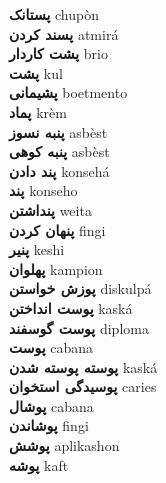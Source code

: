 \textbf{ پستانک  } chupòn \\
\textbf{ پسند کردن  } atmirá \\
\textbf{ پشت کاردار  } brio \\
\textbf{ پشت  } kul \\
\textbf{ پشیمانی  } boetmento \\
\textbf{ پماد  } krèm \\
\textbf{ پنبه نسوز  } asbèst \\
\textbf{ پنبه کوهی  } asbèst \\
\textbf{ پند دادن  } konsehá \\
\textbf{ پند  } konseho \\
\textbf{ پنداشتن  } weita \\
\textbf{ پنهان کردن  } fingi \\
\textbf{ پنیر  } keshi \\
\textbf{ پهلوان  } kampion \\
\textbf{ پوزش خواستن  } diskulpá \\
\textbf{ پوست انداختن  } kaská \\
\textbf{ پوست گوسفند  } diploma \\
\textbf{ پوست  } cabana \\
\textbf{ پوسته پوسته شدن  } kaská \\
\textbf{ پوسیدگی استخوان  } caries \\
\textbf{ پوشال  } cabana \\
\textbf{ پوشاندن  } fingi \\
\textbf{ پوشش  } aplikashon \\
\textbf{ پوشه  } kaft \\
